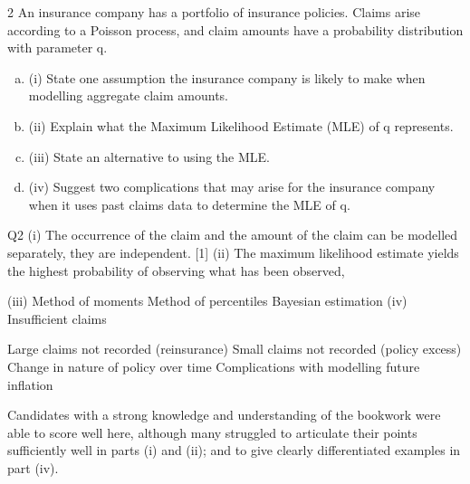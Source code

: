 \documentclass[a4paper,12pt]{article}
\begin{document}
2
An insurance company has a portfolio of insurance policies. Claims arise according to a Poisson process, and claim amounts have a probability distribution with parameter q.
\begin{enumerate}[(a)]
\item (i) State one assumption the insurance company is likely to make when modelling
aggregate claim amounts.
\item
(ii) Explain what the Maximum Likelihood Estimate (MLE) of q represents.
\item
(iii) State an alternative to using the MLE.
\item
(iv) Suggest two complications that may arise for the insurance company when it uses past claims data to determine the MLE of q.
\end{enumerate}
\newpage

Q2
(i) The occurrence of the claim and the amount of the claim can be modelled
separately, they are independent.
[1]
(ii) The maximum likelihood estimate yields the highest probability of observing
what has been observed,

(iii) Method of moments
Method of percentiles
Bayesian estimation
(iv) Insufficient claims

Large claims not recorded (reinsurance)
Small claims not recorded (policy excess)
Change in nature of policy over time
Complications with modelling future inflation


Candidates with a strong knowledge and understanding of the
bookwork were able to score well here, although many struggled to
articulate their points sufficiently well in parts (i) and (ii); and to give
clearly differentiated examples in part (iv).
\end{document}
